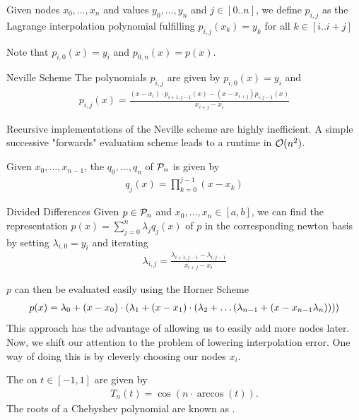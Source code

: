 \begin{definition}
	Given nodes $x_0, \hdots, x_n$ and values $y_0, \hdots, y_n$ and $j \in [0..n]$, we define $p_{i,j}$ as the Lagrange interpolation polynomial fulfilling $p_{i,j}(x_k) = y_k$ for all $k \in [i..i+j]$
\end{definition}
Note that $p_{i,0}(x) = y_i$ and $p_{0,n}(x) = p(x)$.
\begin{importanttheorem}{Neville Scheme}{}
	The polynomials $p_{i,j}$ are given by $p_{i,0}(x) = y_i$ and
	\begin{align*}
		p_{i,j}(x) = \frac{(x-x_i) \cdot p_{i+1,j-1}(x) - (x-x_{i+j})p_{i,j-1}(x)}{x_{i+j} - x_i}
	\end{align*}
\end{importanttheorem}
Recursive implementations of the Neville scheme are highly inefficient. A simple successive "forwards" evaluation scheme leads to a runtime in $\mathcal{O}(n^2)$.
\begin{definition}
	Given $x_0, \hdots, x_{n-1}$, the  $q_0, \hdots, q_n$ of $\mathcal{P}_n$ is given by
	\begin{align*}
		q_j(x) = \prod_{k = 0}^{j-1} (x - x_k)
	\end{align*}
\end{definition}
\begin{importanttheorem}{Divided Differences}{}
	Given $p \in \mathcal{P}_n$ and $x_0, \hdots, x_n \in [a,b]$, we can find the representation $p(x) = \sum_{j = 0}^n \lambda_j q_j(x)$ of $p$ in the corresponding newton basis by setting $\lambda_{i,0} = y_i$ and iterating
	\begin{align*}
		\lambda_{i,j} = \frac{\lambda_{i+1,j-1} - \lambda_{i, j-1}}{x_{i+j} - x_i}
	\end{align*}
\end{importanttheorem}
$p$ can then be evaluated easily using the Horner Scheme
\begin{align*}
	p(x) = \lambda_0 + (x- x_0) \cdot \qty(\lambda_1 + (x - x_1) \cdot (\lambda_2 + \hdots (\lambda_{n-1} + (x - x_{n-1}\lambda_n))))
\end{align*}
This approach has the advantage of allowing us to easily add more nodes later.
\newpar
Now, we shift our attention to the problem of lowering interpolation error. One way of doing this is by cleverly choosing our nodes $x_i$.
\begin{definition}
	The  on $t \in [-1,1]$ are given by
	\begin{align*}
		T_n(t) = \cos(n \cdot \arccos(t)).
	\end{align*}
	The roots of a Chebyshev polynomial are known as .
\end{definition}
